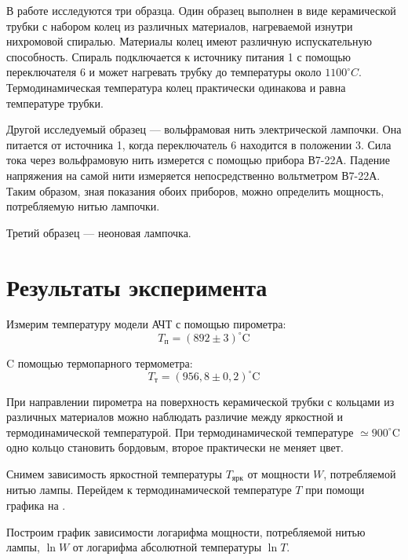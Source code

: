 \documentclass[a4paper, 12pt]{article}
\begin{document}
В работе исследуются три образца. Один образец выполнен в виде
керамической трубки с набором колец из различных материалов,
нагреваемой изнутри нихромовой спиралью. Материалы колец имеют
различную испускательную способность. Спираль подключается к источнику
питания 1 с помощью переключателя 6 и может нагревать трубку до
температуры около $1100^\circ C$. Термодинамическая температура колец
практически одинакова и равна температуре трубки.

Другой исследуемый образец --- вольфрамовая нить электрической
лампочки. Она питается от источника 1, когда переключатель 6 находится
в положении 3. Сила тока через вольфрамовую нить измерется с помощью
прибора В7-22А. Падение напряжения на самой нити измеряется
непосредственно вольтметром В7-22А. Таким образом, зная показания
обоих приборов, можно определить мощность, потребляемую нитью
лампочки.

Третий образец --- неоновая лампочка.





\section{Результаты эксперимента}
Измерим температуру модели АЧТ с помощью пирометра:
\[
    T_\text{п} = (892 \pm 3) ^{\circ}\text{C}
\]

C помощью термопарного термометра:
\[
    T_\text{т} = (956,8 \pm 0,2) ^{\circ}\text{C}
\]

При направлении пирометра на поверхность керамической трубки с
кольцами из различных материалов можно наблюдать различие между
яркостной и термодинамической температурой. При термодинамической
температуре $\simeq 900^\circ\text{C}$ одно кольцо становить бордовым,
второе практически не меняет цвет.

Снимем зависимость яркостной температуры $T_\text{ярк}$ от мощности $W$, потребляемой
нитью лампы. Перейдем к термодинамической температуре $T$ при помощи
графика на . 

Построим график зависимости логарифма мощности, потребляемой нитью
лампы, $\ln W$ от логарифма
абсолютной температуры $\ln T$. 
\end{document}

